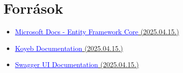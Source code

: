 \documentclass[12pt]{report}
\begin{document}
\begin{figure}[H]
\end{figure}

\chapter{Források}
\begin{itemize}
  \item \href{https://learn.microsoft.com/en-us/ef/core/}{\textcolor{blue}{\underline{Microsoft Docs - Entity Framework Core}}{ (2025.04.15.)}}
  \item \href{https://www.koyeb.com/docs}{\textcolor{blue}{\underline{Koyeb Documentation}}{ (2025.04.15.)}}
  \item \href{https://swagger.io/docs/open-source-tools/swagger-ui/usage/installation/}{\textcolor{blue}{\underline{Swagger UI Documentation}}{ (2025.04.15.)}}
\end{itemize}
\end{document}
